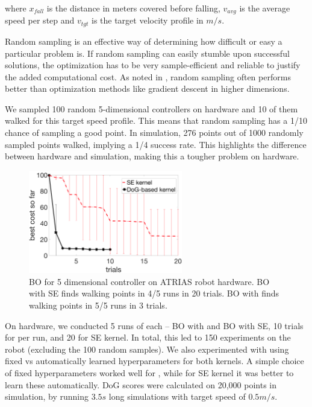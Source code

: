 where $x_{fall}$ is the distance in meters covered before falling, $v_{avg}$ is the average speed per step and $v_{tgt}$ is the target velocity profile in $m/s$. 

Random sampling is an effective way of determining how difficult or easy a particular problem is. If random sampling can easily stumble upon successful solutions, the optimization has to be very sample-efficient and reliable to justify the added computational cost. As noted in \cite{calandra2016bayesian}, random sampling often performs better than optimization methods like gradient descent in higher dimensions. 

We sampled 100 random 5-dimensional controllers on hardware and 10 of them walked for this target speed profile. This means that random sampling has a 1/10 chance of sampling a good point. In simulation, 276 points out of 1000 randomly sampled points walked, implying a 1/4 success rate. This highlights the difference between hardware and simulation, making this a tougher problem on hardware.

\begin{figure}[t]
\centering
\includegraphics[width=0.6\textwidth]{img/hw_raibert_5d.png}
\caption{\small{BO for 5 dimensional controller on ATRIAS robot hardware. BO with SE finds walking points in 4/5 runs in 20 trials. BO with \dogkernel finds walking points in 5/5 runs in 3 trials.}}
\label{fig:hw_raibert_5d}
\end{figure}

On hardware, we conducted 5 runs of each -- BO with \dogkernel and BO with SE, 10 trials for \dogkernel per run, and 20 for SE kernel. In total, this led to 150 experiments on the robot (excluding the 100 random samples). We also experimented with using fixed vs automatically learned hyperparameters for both kernels. A simple choice of fixed hyperparameters worked well for \dogkernel, while for SE kernel it was better to learn these automatically. DoG scores were calculated on 20,000 points in simulation, by running $3.5s$ long simulations with target speed of $0.5m/s$.

